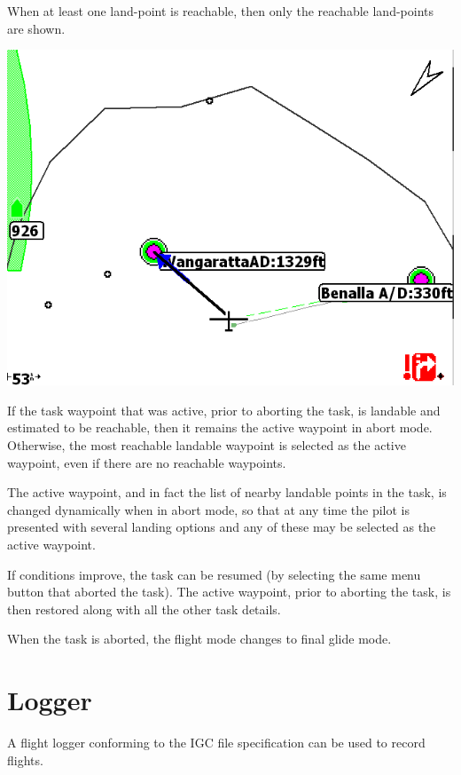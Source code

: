 \documentclass[a4paper,12pt]{refrep}
\begin{document}
When at least one land-point is reachable, then only the reachable land-points are shown.

\begin{center}
\includegraphics[angle=0,width=\linewidth,keepaspectratio='true']{figures/abort-high.png}
\end{center}

If the task waypoint that was active, prior to aborting the task, is
landable and estimated to be reachable, then it remains the active
waypoint in abort mode.  Otherwise, the most reachable landable
waypoint is selected as the active waypoint, even if there are no
reachable waypoints.

The active waypoint, and in fact the list of nearby landable points in
the task, is changed dynamically when in abort mode, so that at any
time the pilot is presented with several landing options and any of
these may be selected as the active waypoint.

If conditions improve, the task can be resumed (by selecting the same
menu button that aborted the task).  The active waypoint, prior to
aborting the task, is then restored along with all the other task
details.

When the task is aborted, the flight mode changes to final glide mode.

\section{Logger}

A flight logger conforming to the IGC file specification can be used
to record flights.  
\end{document}
